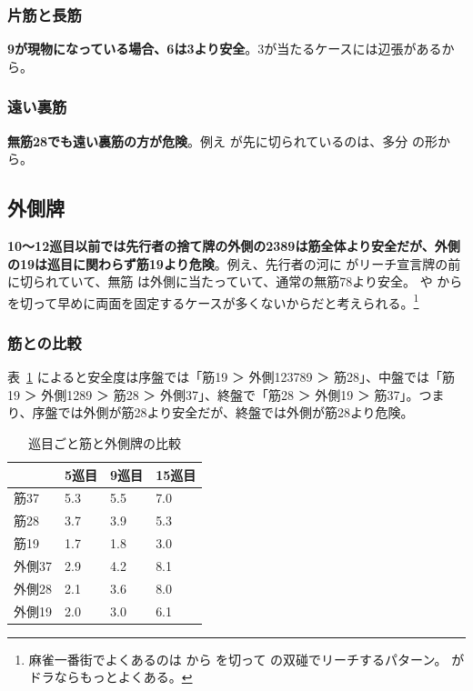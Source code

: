 \documentclass[10pt, twocolumn]{article}
\newlength\stdbls %
\newcommand{\mjfn}[1]{\raisebox{-.135\stdbls}{\mahjong[0.75\stdbls]{#1}}}
\begin{document}
\subsubsection*{片筋と長筋} 

\textbf{9が現物になっている場合、6は3より安全}\citep[][pp. 45--46]{miinin-choice}。3が当たるケースには辺張があるから。

\subsubsection*{遠い裏筋}

\textbf{無筋28でも遠い裏筋の方が危険}\citep[][pp.~175--176]{miinin-choice}。例え  が先に切られているのは、多分  の形から。

\subsection{外側牌}

\textbf{10〜12巡目以前では先行者の捨て牌の外側の2389は筋全体より安全だが、外側の19は巡目に関わらず筋19より危険}\citep[pp. 148--151]{miinin-stat}。例え、先行者の河に  がリーチ宣言牌の前に切られていて、無筋  は外側に当たっていて、通常の無筋78より安全。 や  から  を切って早めに両面を固定するケースが多くないからだと考えられる。\footnote{麻雀一番街でよくあるのは \mjfn{112p} から \mjfn{2p} を切って \mjfn{11p} の双碰でリーチするパターン。\mjfn{1p} がドラならもっとよくある。}

\subsubsection*{筋との比較} 

表~\ref{tab:dealin-rate-sotogawa} によると安全度は序盤では「筋19 ＞ 外側123789 ＞ 筋28」、中盤では「筋19 ＞ 外側1289 ＞ 筋28 ＞ 外側37」、終盤で「筋28 ＞ 外側19 ＞ 筋37」。つまり、序盤では外側が筋28より安全だが、終盤では外側が筋28より危険。

\begin{table}[ht]
  \centering
  \begin{tabular}{l|lll}
        & 5巡目 & 9巡目 & 15巡目 \\
    \hline
    筋37　 & 5.3 & 5.5 & 7.0 \\
    筋28　 & 3.7 & 3.9 & 5.3 \\
    筋19　 & 1.7 & 1.8 & 3.0 \\
    \hline
    外側37 & 2.9 & 4.2 & 8.1 \\
    外側28 & 2.1 & 3.6 & 8.0 \\
    外側19 & 2.0 & 3.0 & 6.1 \\
  \end{tabular}
  \caption{巡目ごと筋と外側牌の比較}
  \label{tab:dealin-rate-sotogawa}
\end{table}
\end{document}

